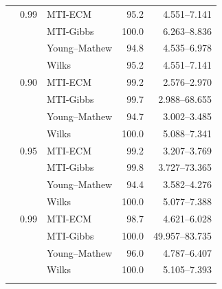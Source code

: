 \begin{longtable}{@{}rrlrr@{}}
\addlinespace[0.3em]
500 & 0.99 & MTI-ECM & 95.2 & 4.551--7.141 \\
 &  & MTI-Gibbs & 100.0 & 6.263--8.836 \\
 &  & Young--Mathew & 94.8 & 4.535--6.978 \\
 &  & Wilks & 95.2 & 4.551--7.141 \\
\addlinespace[0.3em]
1000 & 0.90 & MTI-ECM & 99.2 & 2.576--2.970 \\
 &  & MTI-Gibbs & 99.7 & 2.988--68.655 \\
 &  & Young--Mathew & 94.7 & 3.002--3.485 \\
 &  & Wilks & 100.0 & 5.088--7.341 \\
\addlinespace[0.3em]
1000 & 0.95 & MTI-ECM & 99.2 & 3.207--3.769 \\
 &  & MTI-Gibbs & 99.8 & 3.727--73.365 \\
 &  & Young--Mathew & 94.4 & 3.582--4.276 \\
 &  & Wilks & 100.0 & 5.077--7.388 \\
\addlinespace[0.3em]
1000 & 0.99 & MTI-ECM & 98.7 & 4.621--6.028 \\
 &  & MTI-Gibbs & 100.0 & 49.957--83.735 \\
 &  & Young--Mathew & 96.0 & 4.787--6.407 \\
 &  & Wilks & 100.0 & 5.105--7.393 \\
\addlinespace[0.3em]
\end{longtable}
\clearpage
